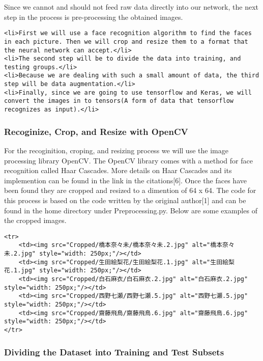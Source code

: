 \documentclass[11pt]{article}
\begin{document}
Since we cannot and should not feed raw data directly into our network,
the next step in the process is pre-processing the obtained images.

\begin{verbatim}
<li>First we will use a face recognition algorithm to find the faces in each picture. Then we will crop and resize them to a format that the neural network can accept.</li>
<li>The second step will be to divide the data into training, and testing groups.</li>
<li>Because we are dealing with such a small amount of data, the third step will be data augmentation.</li>
<li>Finally, since we are going to use tensorflow and Keras, we will convert the images in to tensors(A form of data that tensorflow recognizes as input).</li>
\end{verbatim}

    \subsubsection{Recoginize, Crop, and Resize with
OpenCV}\label{recoginize-crop-and-resize-with-opencv}

For the recoginition, croping, and resizing process we will use the
image processing library OpenCV. The OpenCV library comes with a method
for face recognition called Haar Cascades. More details on Haar Cascades
and its implemention can be found in the link in the citations{[}6{]}.
Once the faces have been found they are cropped and resized to a
dimention of 64 x 64. The code for this process is based on the code
written by the original author{[}1{]} and can be found in the home
directory under Preprocessing.py. Below are some examples of the cropped
images.

    \begin{verbatim}
<tr>
    <td><img src="Cropped/橋本奈々未/橋本奈々未.2.jpg" alt="橋本奈々未.2.jpg" style="width: 250px;"/></td>
    <td><img src="Cropped/生田絵梨花/生田絵梨花.1.jpg" alt="生田絵梨花.1.jpg" style="width: 250px;"/></td>
    <td><img src="Cropped/白石麻衣/白石麻衣.2.jpg" alt="白石麻衣.2.jpg" style="width: 250px;"/></td>
    <td><img src="Cropped/西野七瀬/西野七瀬.5.jpg" alt="西野七瀬.5.jpg" style="width: 250px;"/></td>
    <td><img src="Cropped/齋藤飛鳥/齋藤飛鳥.6.jpg" alt="齋藤飛鳥.6.jpg" style="width: 250px;"/></td>
</tr>
\end{verbatim}

    \subsubsection{Dividing the Dataset into Training and Test
Subsets}\label{dividing-the-dataset-into-training-and-test-subsets}
\end{document}
